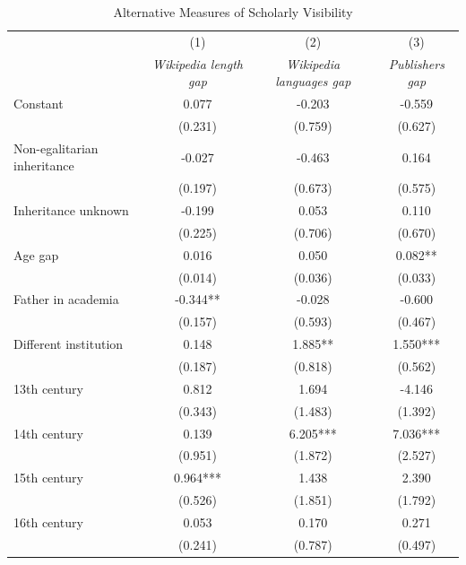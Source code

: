 \begin{table}[H]
\centering
\caption{Alternative Measures of Scholarly Visibility}
\label{tab:alt_measures}

\begin{tablebody}
\begin{tabular}{p{5cm} c c c}
\toprule
 & (1) & (2) & (3) \\
 & \textit{Wikipedia length gap} & \textit{Wikipedia languages gap} & \textit{Publishers gap} \\
\midrule

Constant
& 0.077
& -0.203
& -0.559 \\
& (0.231)
& (0.759)
& (0.627) \\

Non-egalitarian inheritance
& -0.027 
& -0.463 
& 0.164 \\
& (0.197) 
& (0.673) 
& (0.575) \\

Inheritance unknown
& -0.199 
& 0.053 
& 0.110 \\
& (0.225) 
& (0.706) 
& (0.670) \\

Age gap
& 0.016 
& 0.050 
& 0.082** \\
& (0.014) 
& (0.036) 
& (0.033) \\

Father in academia
& -0.344** 
& -0.028 
& -0.600 \\
& (0.157) 
& (0.593) 
& (0.467) \\

Different institution
& 0.148 
& 1.885** 
& 1.550*** \\
& (0.187) 
& (0.818) 
& (0.562) \\

13th century
& 0.812 
& 1.694 
& -4.146 \\
& (0.343) 
& (1.483) 
& (1.392) \\

14th century
& 0.139 
& 6.205*** 
& 7.036*** \\
& (0.951) 
& (1.872) 
& (2.527) \\

15th century
& 0.964*** 
& 1.438 
& 2.390 \\
& (0.526) 
& (1.851) 
& (1.792) \\

16th century
& 0.053 
& 0.170 
& 0.271 \\
& (0.241) 
& (0.787) 
& (0.497) \\


\end{tabular}
\end{tablebody}
\end{table}
